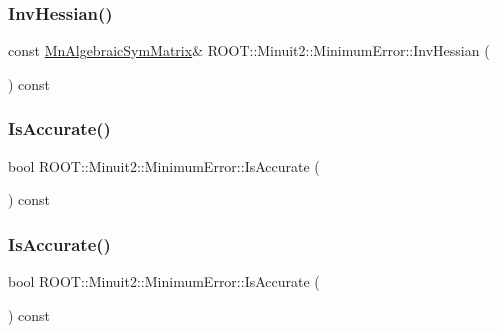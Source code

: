 \subsubsection{\texorpdfstring{InvHessian()}{InvHessian()}\hspace{0.1cm}{\footnotesize\ttfamily [2/2]}}
{\footnotesize\ttfamily const \mbox{\hyperlink{namespaceROOT_1_1Minuit2_a9e74ad97f5537a2e80e52b04d98ecc6e}{Mn\+Algebraic\+Sym\+Matrix}}\& R\+O\+O\+T\+::\+Minuit2\+::\+Minimum\+Error\+::\+Inv\+Hessian (\begin{DoxyParamCaption}{ }\end{DoxyParamCaption}) const\hspace{0.3cm}{\ttfamily [inline]}}

\mbox{\label{classROOT_1_1Minuit2_1_1MinimumError_a70c9ff6b59f2c01e5e54b4010326753d}} 
\subsubsection{\texorpdfstring{IsAccurate()}{IsAccurate()}\hspace{0.1cm}{\footnotesize\ttfamily [1/2]}}
{\footnotesize\ttfamily bool R\+O\+O\+T\+::\+Minuit2\+::\+Minimum\+Error\+::\+Is\+Accurate (\begin{DoxyParamCaption}{ }\end{DoxyParamCaption}) const\hspace{0.3cm}{\ttfamily [inline]}}

\mbox{\label{classROOT_1_1Minuit2_1_1MinimumError_a70c9ff6b59f2c01e5e54b4010326753d}} 
\subsubsection{\texorpdfstring{IsAccurate()}{IsAccurate()}\hspace{0.1cm}{\footnotesize\ttfamily [2/2]}}
{\footnotesize\ttfamily bool R\+O\+O\+T\+::\+Minuit2\+::\+Minimum\+Error\+::\+Is\+Accurate (\begin{DoxyParamCaption}{ }\end{DoxyParamCaption}) const\hspace{0.3cm}{\ttfamily [inline]}}

